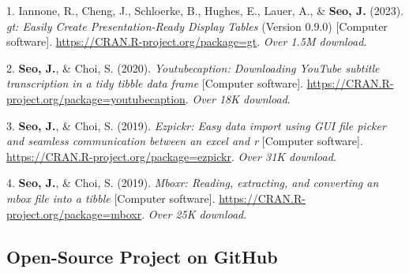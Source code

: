 \documentclass[11pt,a4paper,]{awesome-cv}
\newlength{\cslhangindent}
\newenvironment{CSLReferences}[2] %
 {\begin{list}{}{%
  \setlength{\itemindent}{0pt}
  \setlength{\leftmargin}{0pt}
  \setlength{\parsep}{0pt}
  \ifodd #1
   \setlength{\leftmargin}{\cslhangindent}
   \setlength{\itemindent}{-1\cslhangindent}
  \fi
  \setlength{\itemsep}{#2\baselineskip}}}
 {\end{list}}
\begin{document}
\label{refs-e4f6fe834f2d1b4cdb55cfea3d65ab90}
\begin{CSLReferences}{1}{0}
1. Iannone, R., Cheng, J., Schloerke, B., Hughes, E., Lauer, A., \&
\textbf{Seo, J.} (2023). \emph{gt: Easily Create Presentation-Ready
Display Tables} (Version 0.9.0) {[}Computer software{]}.
\url{https://CRAN.R-project.org/package=gt}. \emph{Over 1.5M download}.

2. \textbf{Seo, J.}, \& Choi, S. (2020). \emph{Youtubecaption:
Downloading YouTube subtitle transcription in a tidy tibble data frame}
{[}Computer software{]}.
\url{https://CRAN.R-project.org/package=youtubecaption}. \emph{Over 18K
download}.

3. \textbf{Seo, J.}, \& Choi, S. (2019). \emph{Ezpickr: Easy data import
using GUI file picker and seamless communication between an excel and r}
{[}Computer software{]}.
\url{https://CRAN.R-project.org/package=ezpickr}. \emph{Over 31K
download}.

4. \textbf{Seo, J.}, \& Choi, S. (2019). \emph{Mboxr: Reading,
extracting, and converting an mbox file into a tibble} {[}Computer
software{]}. \url{https://CRAN.R-project.org/package=mboxr}. \emph{Over
25K download}.

\end{CSLReferences}

\newpage

\subsection{Open-Source Project on
GitHub}\label{open-source-project-on-github}
\end{document}
